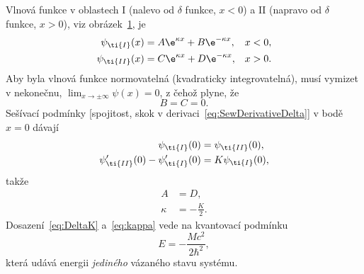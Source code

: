 \begin{solution}
\begin{enumerate}
		Vlnová funkce v oblastech I (nalevo od $\delta$ funkce, $x<0$) a II (napravo od $\delta$ funkce, $x>0$), viz obrázek~\ref{fig:DeltaWF}, je
		\begin{subequations}
			\begin{align}
				\psi_{\ti{I}}(x)&=A\e^{\kappa x}+B\e^{-\kappa x},  & x&<0,\\
				\psi_{\ti{II}}(x)&=C\e^{\kappa x}+D\e^{-\kappa x}, & x&>0.
			\end{align}
			\label{eq:DeltaWF}				
		\end{subequations}
		Aby byla vlnová funkce normovatelná (kvadraticky integrovatelná), musí vymizet v nekonečnu, $\lim_{x\rightarrow\pm\infty}\psi(x)=0$, z čehož plyne, že
		\begin{equation}
			B=C=0.
		\end{equation}
		Sešívací podmínky [spojitost, skok v derivaci~\eqref{eq:SewDerivativeDelta}] v bodě $x=0$ dávají
		\begin{subequations}
			\begin{align}
				\psi_{\ti{I}}(0)
					&=\psi_{\ti{II}}(0),\\
				\psi'_{\ti{II}}(0)-\psi'_{\ti{I}}(0)
					&=K\psi_{\ti{I}}(0),
			\end{align}
		\end{subequations}
		takže
		\begin{subequations}			
			\begin{align}
				A&=D,\\
				\kappa&=-\frac{K}{2}.
				\label{eq:Deltakappa}
			\end{align}
		\end{subequations}
		Dosazení~\eqref{eq:DeltaK} a~\eqref{eq:kappa} vede na kvantovací podmínku
		\begin{equation}
			\label{eq:DeltaEnergy}
			\boxed{E=-\frac{Mc^{2}}{2\hbar^{2}}},
		\end{equation}
		která udává energii \emph{jediného} vázaného stavu systému.
		
		\begin{figure}[!htbp]
			\centering
			\label{fig:DeltaWF}
		\end{figure}
		

\end{enumerate}
\end{solution}
